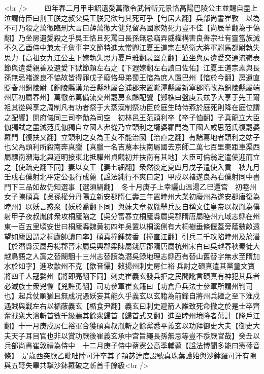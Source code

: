 <br />
　　四年春二月甲申詔遺愛萬徹令武皆斬元景恪高陽巴陵公主並賜自盡上泣謂侍臣曰荆王朕之叔父吳王朕兄欲匄其死可乎【匄居大翻】兵部尚書崔敦　以為不可乃殺之萬徹臨刑大言曰薛萬徹大健兒留為國家効死力豈不佳【尚辰羊翻為于偽翻】乃坐房遺愛殺之乎吳王恪且死罵曰長孫無忌竊弄威權構害良善宗社有靈當族滅不久乙酉侍中兼太子詹事宇文節特進太常卿江夏王道宗左驍衛大將軍駙馬都尉執失思力【高祖女九江公主下嫁執失思力夏戶雅翻驍堅堯翻】並坐與房遺愛交通流嶺表節與遺愛親善及遺愛下獄節頗左右之【下遐嫁翻左右讀曰佐佑】江夏王道宗素與長孫無忌褚遂良不恊故皆得罪戊子廢恪母弟蜀王愔為庶人置巴州【愔於今翻】房遺直貶春州銅陵尉【銅陵縣漢允吾縣地屬合浦郡宋置瀧潭縣屬新寧郡隋改為銅陵縣屬端州唐初屬春州】萬徹弟萬備流交州罷房玄齡配饗【鄭樵曰盤庚云兹予大享于先王爾袓其從與享之周制凡有功者祭于大蒸漢制祭功臣於庭生時侍燕於庭死則降在庭位謂之配饗】開府儀同三司李勣為司空　初林邑王范頭利卒【卒子恤翻】子真龍立大臣伽獨弑之盡滅范氏伽獨自立國人弗從乃立頭利之壻婆羅門為王國人咸思范氏復罷婆羅門【復扶又翻】立頭利之女為王女不能治國【治直之翻】有諸葛地者頭利之姑子也父為頭利所殺南奔真臘【真臘一名吉蔑本扶南屬國去京師二萬七百里東距車渠西屬驃南瀕海北與道明接東北抵驩州貞觀初并扶南有其地】大臣可倫翁定遣使迎而立之【使疏吏翻下同】妻以女王【妻七細翻】衆然後定夏四月戊子遣使入貢　秋九月壬戍右僕射北平定公張行成薨【諡法純行不爽曰定】甲戍以褚遂良為右僕射同中書門下三品如故仍知選事【選須絹翻】　冬十月庚子上幸驪山温湯乙巳還宫　初睦州女子陳碩真【吳孫權分丹陽立新安郡隋仁壽三年置睦州大業初廢州為遂安郡唐復為睦州】以妖言惑衆【妖於喬翻下同】與妹夫章叔胤舉兵反自稱文佳皇帝以叔胤為僕射甲子夜叔胤帥衆攻桐廬陷之【吳分富春立桐廬縣屬吳郡隋唐屬睦州九域志縣在州東一百五里頃安世曰桐廬縣魏黄初四年吳置以桐溪側有大桐樹垂條偃蓋旁䕃數畝遠望如廬因謂之桐廬帥讀曰率】碩真撞鍾焚香【撞直江翻】引兵二千攻陷睦州及於潛【於潛縣漢屬丹楊郡晉宋屬吳興郡梁陳屬錢唐郡隋唐屬杭州宋白曰吳越春秋秦徙大越鳥語之人寘之替闞駰十三州志替讀為潛吳録地理志縣西有替山舊替字無水至隋加水於如字】進攻歙州不克【歙音懾】敕揚州刺史房仁裕兵討之碩真遣其黨童文寶將四千人寇婺州【將即亮翻下同】刺史崔義玄發兵拒之民間訛言碩真有神犯其兵者必滅族士衆兇懼【兇許勇翻】司功參軍崔玄籍曰【功倉戶兵法士參軍所謂州判司也】起兵仗順猶且無成况憑妖妄其能久乎義玄以玄籍為前鋒自將州兵繼之至下淮戍遇賊與戰左右以楯蔽義玄【楯食尹翻】義玄曰刺史避箭人誰致死命撤之於是士卒齊奮賊衆大潰斬首數千級聼其餘衆歸首【歸首式又翻】進至睦州境降者萬計【降戶江翻】十一月庚戍房仁裕軍合獲碩真叔胤斬之餘黨悉平義玄以功拜御史大夫【御史大夫天子耳目官也非以賞功厥後崔義玄承中宫旨繩長孫無忌等豈不忝厥官哉】癸丑以兵部尚書崔敦禮為侍中　十二月庚子侍中蓨憲公高季輔薨【諡法博聞多能曰憲蓚音條】　是歲西突厥乙毗咄陸可汗卒其子頡苾逹度設號真珠葉護始與沙鉢羅可汗有隙與五弩失畢共撃沙鉢羅破之斬首千餘級<br />
